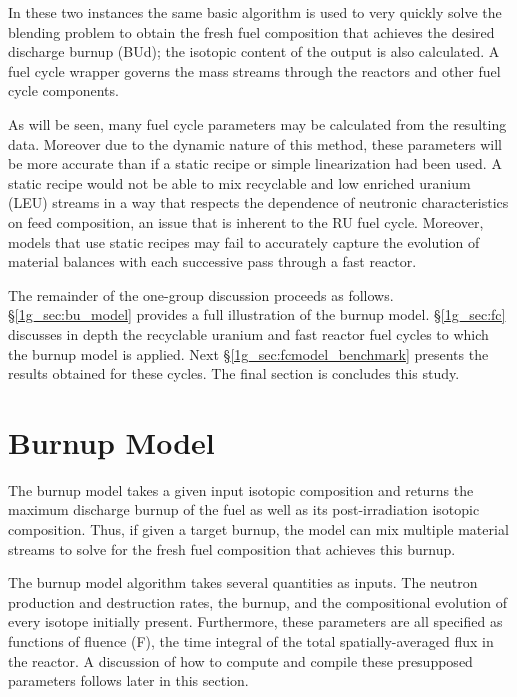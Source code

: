 In these two instances the same basic algorithm is used to very quickly solve the blending problem 
to obtain the fresh fuel composition that achieves the desired discharge burnup (BUd); the isotopic 
content of the output is also calculated.   A fuel cycle wrapper governs the mass streams through 
the reactors and other fuel cycle components.  

As will be seen, many fuel cycle parameters may be calculated from the resulting data.  Moreover 
due to the dynamic nature of this method, these parameters will be more accurate 
than if a static recipe or simple linearization had been used.  A static recipe would not be able 
to mix recyclable and low enriched uranium (LEU) streams in a way that respects the dependence of 
neutronic characteristics on feed composition, an issue that is inherent to the RU fuel cycle.  
Moreover, models that use static recipes may fail to accurately capture the evolution of material 
balances with each successive pass through a fast reactor.   

The remainder of the one-group discussion proceeds as follows. \S \ref{1g_sec:bu_model} provides a 
full illustration of the burnup model.  \S \ref{1g_sec:fc} discusses in depth the recyclable 
uranium and fast reactor fuel cycles to which the burnup model is applied.  Next \S \ref{1g_sec:fcmodel_benchmark}
presents the results obtained for these cycles.  The final section is concludes this 
study. 




\section{Burnup Model}
\label{1g_sec:bu_model}
The burnup model takes a given input isotopic composition and returns the maximum discharge 
burnup of the fuel as well as its post-irradiation isotopic composition.  Thus, if given a 
target burnup, the model can mix multiple material streams to solve for the fresh fuel composition 
that achieves this burnup.

The burnup model algorithm takes several quantities as inputs.
The neutron production and destruction rates, the burnup, and the compositional evolution of 
every isotope initially present.  Furthermore, 
these parameters are all specified as functions of fluence (F), the time integral of the total spatially-averaged 
flux in the reactor. A discussion of how to compute and compile these presupposed parameters follows 
later in this section. 


